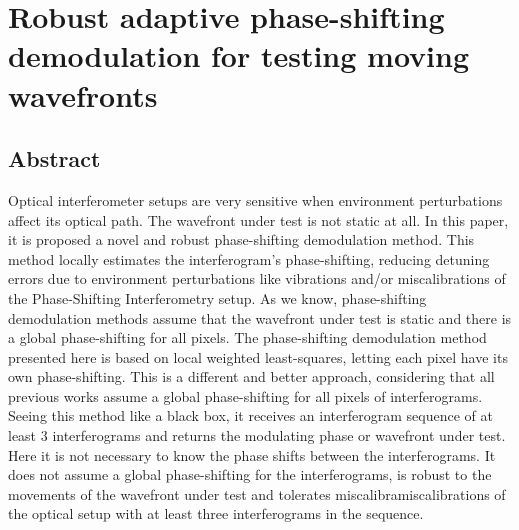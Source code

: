 \chapter{Robust adaptive phase-shifting demodulation for testing moving 
wavefronts}

\section{Abstract}
Optical interferometer setups are very sensitive when environment
perturbations affect its optical path. The wavefront under test is not
static at all. In this paper, it is proposed a novel and robust phase-shifting
demodulation method. This method locally estimates the interferogram’s
phase-shifting, reducing detuning errors due to environment perturbations
like vibrations and/or miscalibrations of the Phase-Shifting Interferometry
setup. As we know, phase-shifting demodulation methods assume that the
wavefront under test is static and there is a global phase-shifting for all
pixels. The phase-shifting demodulation method presented here is based on
local weighted least-squares, letting each pixel have its own phase-shifting.
This is a different and better approach, considering that all previous works
assume a global phase-shifting for all pixels of interferograms. Seeing this
method like a black box, it receives an interferogram sequence of at least 3
interferograms and returns the modulating phase or wavefront under test.
Here it is not necessary to know the phase shifts between the interferograms.
It does not assume a global phase-shifting for the interferograms, is robust
to the movements of the wavefront under test and tolerates
miscalibramiscalibrations of the optical setup with at least three
interferograms in the sequence.


